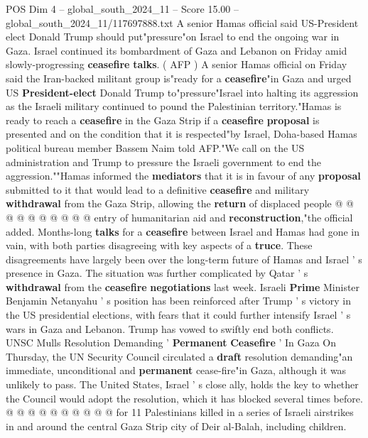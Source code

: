 \begin{textsample}{POS Dim 4 – global\_south\_2024\_11 – Score 15.00 – global\_south\_2024\_11/117697888.txt}  \label{ex:f4_pos_258}
A senior Hamas official said US-President elect Donald Trump should put"pressure"on Israel to end the ongoing war in Gaza.
Israel continued its bombardment of Gaza and Lebanon on Friday amid slowly-progressing \textbf{ceasefire} \textbf{talks}. ( AFP ) A senior Hamas official on Friday said the Iran-backed militant group is"ready for a \textbf{ceasefire}"in Gaza and urged US \textbf{President-elect} Donald Trump to"pressure"Israel into halting its aggression as the Israeli military continued to pound the Palestinian territory."Hamas is ready to reach a \textbf{ceasefire} in the Gaza Strip if a \textbf{ceasefire} \textbf{proposal} is presented and on the condition that it is respected"by Israel, Doha-based Hamas political bureau member Bassem Naim told AFP."We call on the US administration and Trump to pressure the Israeli government to end the aggression.""Hamas informed the \textbf{mediators} that it is in favour of any \textbf{proposal} submitted to it that would lead to a definitive \textbf{ceasefire} and military \textbf{withdrawal} from the Gaza Strip, allowing the \textbf{return} of displaced people @ @ @ @ @ @ @ @ @ @ entry of humanitarian aid and \textbf{reconstruction},"the official added.
Months-long \textbf{talks} for a \textbf{ceasefire} between Israel and Hamas had gone in vain, with both parties disagreeing with key aspects of a \textbf{truce}.
These disagreements have largely been over the long-term future of Hamas and Israel ' s presence in Gaza.
The situation was further complicated by Qatar ' s \textbf{withdrawal} from the \textbf{ceasefire} \textbf{negotiations} last week.
Israeli \textbf{Prime} Minister Benjamin Netanyahu ' s position has been reinforced after Trump ' s victory in the US presidential elections, with fears that it could further intensify Israel ' s wars in Gaza and Lebanon.
Trump has vowed to swiftly end both conflicts.
UNSC Mulls Resolution Demanding ' \textbf{Permanent} \textbf{Ceasefire} ' In Gaza On Thursday, the UN Security Council circulated a \textbf{draft} resolution demanding"an immediate, unconditional and \textbf{permanent} cease-fire"in Gaza, although it was unlikely to pass.
The United States, Israel ' s close ally, holds the key to whether the Council would adopt the resolution, which it has blocked several times before. @ @ @ @ @ @ @ @ @ @ for 11 Palestinians killed in a series of Israeli airstrikes in and around the central Gaza Strip city of Deir al-Balah, including children.

\end{textsample}
